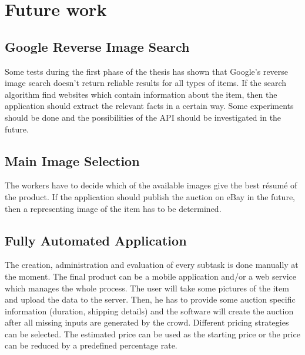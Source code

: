 \section{Future work}
\subsection{Google Reverse Image Search}
Some tests during the first phase of the thesis has shown that Google's reverse image search doesn't return reliable results for all types of items. If the search algorithm find websites which contain information about the item, then the application should extract the relevant facts in a certain way. Some experiments should be done and the possibilities of the API should be investigated in the future. 
\subsection{Main Image Selection}
The workers have to decide which of the available images give the best r\'{e}sum\'{e} of the product. If the application should publish the auction on eBay in the future, then a representing image of the item has to be determined. 
\subsection{Fully Automated Application}
The creation, administration and evaluation of every subtask is done manually at the moment. The final product can be a mobile application and/or a web service which manages the whole process. The user will take some pictures of the item and upload the data to the server. Then, he has to provide some auction specific information (duration, shipping details) and the software will create the auction after all missing inputs are generated by the crowd. Different pricing strategies can be selected. The estimated price can be used as the starting price or the price can be reduced by a predefined percentage rate. 
